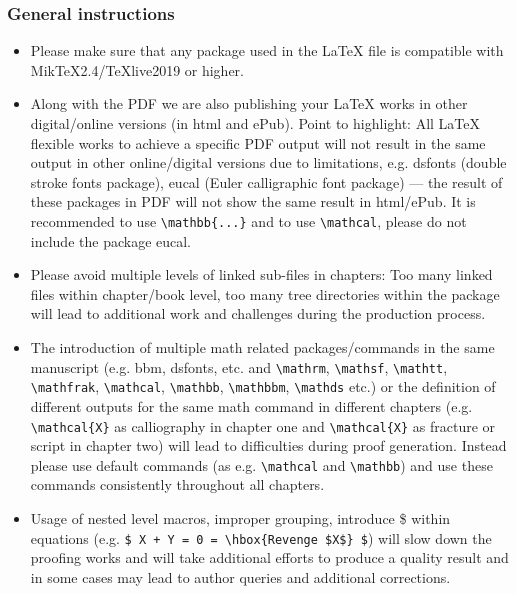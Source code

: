 \documentclass[graybox]{svmono}
\begin{document}
\eject

\subsubsection*{General instructions}

\begin{itemize}
\item Please make sure that any package used in the LaTeX file is compatible with MikTeX2.4/TeXlive2019 or higher.

\item Along with the PDF we are also publishing your LaTeX works in other digital/online versions (in html and ePub). Point to highlight: All LaTeX flexible works to achieve a specific PDF output will not result in the same output in other online/digital versions due to limitations, e.g. dsfonts (double stroke fonts package), eucal (Euler calligraphic font package) --- the result of these packages in PDF will not show the same result in html/ePub. It is recommended to use \verb|\mathbb{...}| and to use \verb|\mathcal|, please do not include the package eucal.

\item Please avoid multiple levels of linked sub-files in chapters: Too many linked files within chapter/book level, too many tree directories within the package will lead to additional work and challenges during the production process.

\item The introduction of multiple math related packages/commands in the same manuscript (e.g. bbm, dsfonts, etc. and \verb|\mathrm|, \verb|\mathsf|, \verb|\mathtt|, \verb|\mathfrak|, \verb|\mathcal|, \verb|\mathbb|, \verb|\mathbbm|, \verb|\mathds| etc.) or the definition of different outputs for the same math command in different chapters (e.g. \verb|\mathcal{X}| as calliography in chapter one and \verb|\mathcal{X}| as fracture or script in chapter two) will lead to difficulties during proof generation. Instead please use default commands (as e.g. \verb|\mathcal| and \verb|\mathbb|) and use these commands consistently throughout all chapters.

\item Usage of nested level macros, improper grouping, introduce \$ within equations (e.g. \verb|$ X + Y = 0 = \hbox{Revenge $X$} $|) will slow down the proofing works and will take additional efforts to produce a quality result and in some cases may lead to author queries and additional corrections.


\end{itemize}
\end{document}
